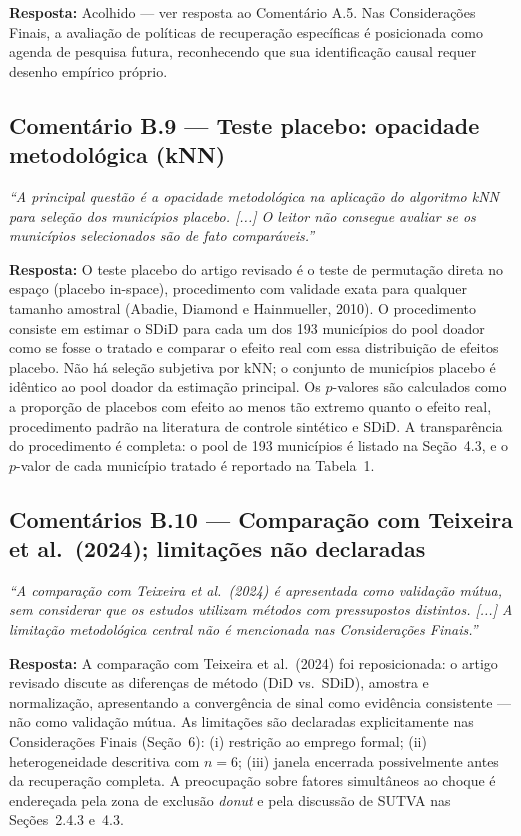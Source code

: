 \documentclass[a4paper,12pt]{article}
\newcommand{\avB}[1]{\textcolor{corB}{\textit{#1}}}
\newcommand{\resposta}[1]{\noindent\textbf{Resposta:} #1}
\begin{document}
\bigskip

\resposta{Acolhido — ver resposta ao Comentário A.5. Nas Considerações Finais, a
avaliação de políticas de recuperação específicas é posicionada como agenda de pesquisa
futura, reconhecendo que sua identificação causal requer desenho empírico próprio.}

\bigskip

\subsection*{Comentário B.9 — Teste placebo: opacidade metodológica (kNN)}

\avB{``A principal questão é a opacidade metodológica na aplicação do algoritmo kNN
para seleção dos municípios placebo. [...] O leitor não consegue avaliar se os
municípios selecionados são de fato comparáveis.''}

\bigskip

\resposta{O teste placebo do artigo revisado é o teste de permutação direta no espaço
(placebo in-space), procedimento com validade exata para qualquer tamanho amostral
(Abadie, Diamond e Hainmueller, 2010). O procedimento consiste em estimar o SDiD para
cada um dos 193 municípios do pool doador como se fosse o tratado e comparar o efeito
real com essa distribuição de efeitos placebo. Não há seleção subjetiva por kNN; o
conjunto de municípios placebo é idêntico ao pool doador da estimação principal. Os
$p$-valores são calculados como a proporção de placebos com efeito ao menos tão extremo
quanto o efeito real, procedimento padrão na literatura de controle sintético e SDiD.
A transparência do procedimento é completa: o pool de 193 municípios é listado na
Seção~4.3, e o $p$-valor de cada município tratado é reportado na Tabela~1.}

\bigskip

\subsection*{Comentários B.10 — Comparação com Teixeira et al.\ (2024); limitações
não declaradas}

\avB{``A comparação com Teixeira et al.\ (2024) é apresentada como validação mútua,
sem considerar que os estudos utilizam métodos com pressupostos distintos. [...] A
limitação metodológica central não é mencionada nas Considerações Finais.''}

\bigskip

\resposta{A comparação com Teixeira et al.\ (2024) foi reposicionada: o artigo
revisado discute as diferenças de método (DiD vs.\ SDiD), amostra e normalização,
apresentando a convergência de sinal como evidência consistente — não como validação
mútua. As limitações são declaradas explicitamente nas Considerações Finais (Seção~6):
(i) restrição ao emprego formal; (ii) heterogeneidade descritiva com $n = 6$; (iii)
janela encerrada possivelmente antes da recuperação completa. A preocupação sobre
fatores simultâneos ao choque é endereçada pela zona de exclusão \textit{donut} e pela
discussão de SUTVA nas Seções~2.4.3 e~4.3.}
\end{document}
